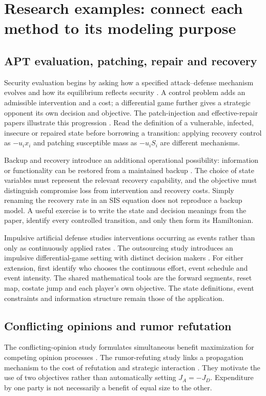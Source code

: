 \documentclass[11pt,a4paper]{article}
\theoremstyle{definition}
\theoremstyle{remark}
\begin{document}
\section{Research examples: connect each method to its modeling purpose}
\subsection{APT evaluation, patching, repair and recovery}
Security evaluation begins by asking how a specified attack--defense mechanism evolves and how its equilibrium reflects security \cite{security2017}. A control problem adds an admissible intervention and a cost; a differential game further gives a strategic opponent its own decision and objective. The patch-injection and effective-repair papers illustrate this progression \cite{patch2018,repair2019}. Read the definition of a vulnerable, infected, insecure or repaired state before borrowing a transition: applying recovery control as $-u_i x_i$ and patching susceptible mass as $-u_i S_i$ are different mechanisms.

Backup and recovery introduce an additional operational possibility: information or functionality can be restored from a maintained backup \cite{backup2021}. The choice of state variables must represent the relevant recovery capability, and the objective must distinguish compromise loss from intervention and recovery costs. Simply renaming the recovery rate in an SIS equation does not reproduce a backup model. A useful exercise is to write the state and decision meanings from the paper, identify every controlled transition, and only then form its Hamiltonian.

Impulsive artificial defense studies interventions occurring as events rather than only as continuously applied rates \cite{impulse2023}. The outsourcing study introduces an impulsive differential-game setting with distinct decision makers \cite{outsource2024}. For either extension, first identify who chooses the continuous effort, event schedule and event intensity. The shared mathematical tools are the forward segments, reset map, costate jump and each player's own objective. The state definitions, event constraints and information structure remain those of the application.

\subsection{Conflicting opinions and rumor refutation}
The conflicting-opinion study formulates simultaneous benefit maximization for competing opinion processes \cite{opinions2020}. The rumor-refuting study links a propagation mechanism to the cost of refutation and strategic interaction \cite{rumor2021}. They motivate the use of two objectives rather than automatically setting $J_A=-J_D$. Expenditure by one party is not necessarily a benefit of equal size to the other.
\end{document}
